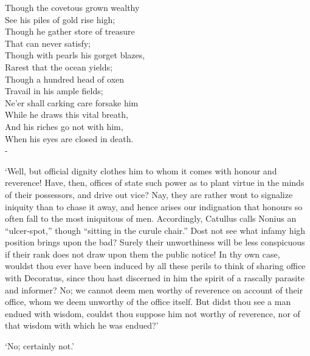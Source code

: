 \documentclass[12pt]{book}
\newenvironment{ipoem}[1]%
  {\setcounter{poemindentevery}{#1}\begin{poem}\small}%
  {\end{poem}\setcounter{poemindentevery}{0}}
\begin{document}
\begin{ipoem}{2}
    Though the covetous grown wealthy \\
      See his piles of gold rise high; \\
    Though he gather store of treasure \\
      That can never satisfy; \\
    Though with pearls his gorget blazes, \\
      Rarest that the ocean yields; \\
    Though a hundred head of oxen \\
      Travail in his ample fields; \\
    Ne'er shall carking care forsake him \\
      While he draws this vital breath, \\
    And his riches go not with him, \\
      When his eyes are closed in death. \\-
\end{ipoem}

`Well, but official dignity clothes him to whom it comes with honour and
reverence! Have, then, offices of state such power as to plant virtue in
the minds of their possessors, and drive out vice? Nay, they are rather
wont to signalize iniquity than to chase it away, and hence arises our
indignation that honours so often fall to the most iniquitous of men.
Accordingly, Catullus calls Nonius an ``ulcer-spot,'' though ``sitting in
the curule chair.'' Dost not see what infamy high position brings upon
the bad? Surely their unworthiness will be less conspicuous if their
rank does not draw upon them the public notice! In thy own case, wouldst
thou ever have been induced by all these perils to think of sharing
office with Decoratus, since thou hast discerned in him the spirit of a
rascally parasite and informer? No; we cannot deem men worthy of
reverence on account of their office, whom we deem unworthy of the
office itself. But didst thou see a man endued with wisdom, couldst thou
suppose him not worthy of reverence, nor of that wisdom with which he
was endued?'

`No; certainly not.'
\end{document}
